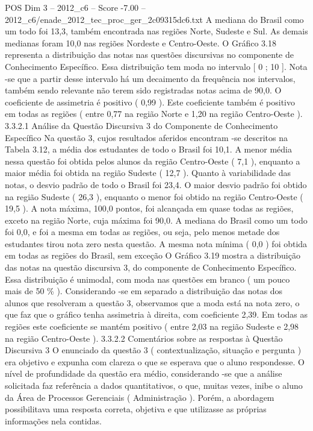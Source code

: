 \begin{textsample}{POS Dim 3 – 2012\_c6 – Score -7.00 – 2012\_c6/enade\_2012\_tec\_proc\_ger\_2c09315dc6.txt}
A mediana do Brasil como um todo foi 13,3, também encontrada nas regiões Norte, Sudeste e Sul.
As demais medianas foram 10,0 nas regiões Nordeste e Centro-Oeste.
O Gráfico 3.18 representa a distribuição das notas nas questões discursivas no componente de Conhecimento Específico.
Essa distribuição tem moda no intervalo [ 0 ; 10 ].
Nota -se que a partir desse intervalo há um decaimento da frequência nos intervalos, também sendo relevante não terem sido registradas notas acima de 90,0.
O coeficiente de assimetria é positivo ( 0,99 ).
Este coeficiente também é positivo em todas as regiões ( entre 0,77 na região Norte e 1,20 na região Centro-Oeste ). 3.3.2.1 Análise da Questão Discursiva 3 do Componente de Conhecimento Específico Na questão 3, cujos resultados aferidos encontram -se descritos na Tabela 3.12, a média dos estudantes de todo o Brasil foi 10,1.
A menor média nessa questão foi obtida pelos alunos da região Centro-Oeste ( 7,1 ), enquanto a maior média foi obtida na região Sudeste ( 12,7 ).
Quanto à variabilidade das notas, o desvio padrão de todo o Brasil foi 23,4.
O maior desvio padrão foi obtido na região Sudeste ( 26,3 ), enquanto o menor foi obtido na região Centro-Oeste ( 19,5 ).
A nota máxima, 100,0 pontos, foi alcançada em quase todas as regiões, exceto na região Norte, cuja máxima foi 90,0.
A mediana do Brasil como um todo foi 0,0, e foi a mesma em todas as regiões, ou seja, pelo menos metade dos estudantes tirou nota zero nesta questão.
A mesma nota mínima ( 0,0 ) foi obtida em todas as regiões do Brasil, sem exceção O Gráfico 3.19 mostra a distribuição das notas na questão discursiva 3, do componente de Conhecimento Específico.
Essa distribuição é unimodal, com moda nas questões em branco ( um pouco mais de 50 \% ).
Considerando -se em separado a distribuição das notas dos alunos que resolveram a questão 3, observamos que a moda está na nota zero, o que faz que o gráfico tenha assimetria à direita, com coeficiente 2,39.
Em todas as regiões este coeficiente se mantém positivo ( entre 2,03 na região Sudeste e 2,98 na região Centro-Oeste ). 3.3.2.2 Comentários sobre as respostas à Questão Discursiva 3 O enunciado da questão 3 ( contextualização, situação e pergunta ) era objetivo e expunha com clareza o que se esperava que o aluno respondesse.
O nível de profundidade da questão era médio, considerando -se que a análise solicitada faz referência a dados quantitativos, o que, muitas vezes, inibe o aluno da Área de Processos Gerenciais ( Administração ).
Porém, a abordagem possibilitava uma resposta correta, objetiva e que utilizasse as próprias informações nela contidas.

\end{textsample}
